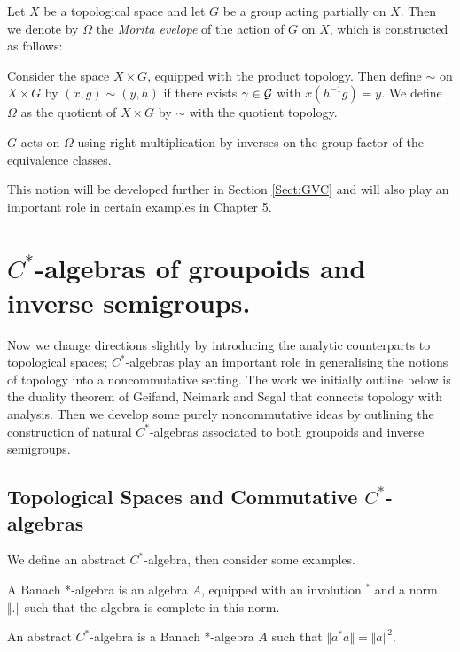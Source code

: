 \begin{definition}
Let $X$ be a topological space and let $G$ be a group acting partially on $X$. Then we denote by $\Omega$ the \textit{Morita evelope} of the action of $G$ on $X$, which is constructed as follows:

Consider the space $X\times G$, equipped with the product topology. Then define $\sim$ on $X\times G$ by $(x,g)\sim (y,h)$ if there exists $\gamma \in \mathcal{G}$ with $x(h^{-1}g)=y$. We define $\Omega$ as the quotient of $X\times G$ by $\sim$ with the quotient topology. 

$G$ acts on $\Omega$ using right multiplication by inverses on the group factor of the equivalence classes.
\end{definition}

This notion will be developed further in Section \ref{Sect:GVC} and will also play an important role in certain examples in Chapter 5.

\section{\texorpdfstring{$C^{*}$}{C*}-algebras of groupoids and inverse semigroups.}
Now we change directions slightly by introducing the analytic counterparts to topological spaces; $C^{*}$-algebras play an important role in generalising the notions of topology into a noncommutative setting. The work we initially outline below is the duality theorem of Geifand, Neimark and Segal that connects topology with analysis. Then we develop some purely noncommutative ideas by outlining the construction of natural $C^{*}$-algebras associated to both groupoids and inverse semigroups.

\subsection{Topological Spaces and Commutative $C^{*}$-algebras}

We define an abstract $C^{*}$-algebra, then consider some examples.

\begin{definition}
A Banach *-algebra is an algebra $A$, equipped with an involution $^{*}$ and a norm $\Vert . \Vert$ such that the algebra is complete in this norm.
\end{definition}

\begin{definition}
An abstract $C^{*}$-algebra is a Banach *-algebra $A$ such that $\Vert a^{*}a \Vert = \Vert a \Vert^{2}$.
\end{definition}

